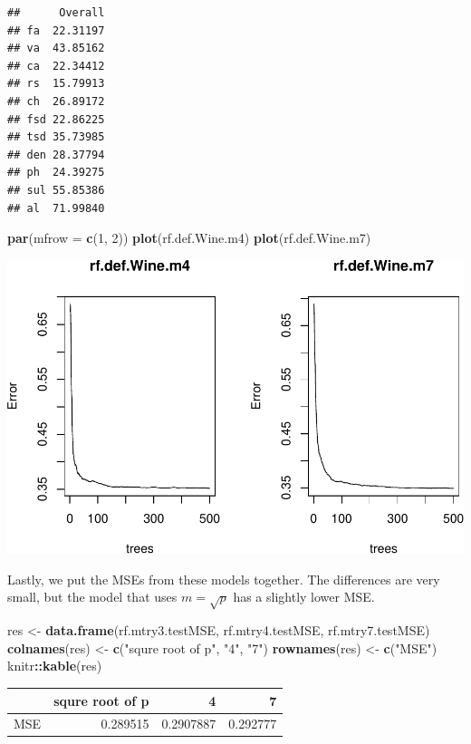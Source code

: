 \documentclass[
]{book}
\newenvironment{Shaded}{\begin{snugshade}}{\end{snugshade}}
\newcommand{\AttributeTok}[1]{\textcolor[rgb]{0.13,0.29,0.53}{#1}}
\newcommand{\DecValTok}[1]{\textcolor[rgb]{0.00,0.00,0.81}{#1}}
\newcommand{\FunctionTok}[1]{\textcolor[rgb]{0.13,0.29,0.53}{\textbf{#1}}}
\newcommand{\NormalTok}[1]{#1}
\newcommand{\OtherTok}[1]{\textcolor[rgb]{0.56,0.35,0.01}{#1}}
\newcommand{\SpecialCharTok}[1]{\textcolor[rgb]{0.81,0.36,0.00}{\textbf{#1}}}
\newcommand{\StringTok}[1]{\textcolor[rgb]{0.31,0.60,0.02}{#1}}
\begin{document}
\begin{verbatim}
##      Overall
## fa  22.31197
## va  43.85162
## ca  22.34412
## rs  15.79913
## ch  26.89172
## fsd 22.86225
## tsd 35.73985
## den 28.37794
## ph  24.39275
## sul 55.85386
## al  71.99840
\end{verbatim}

\begin{Shaded}
\begin{Highlighting}[]
\FunctionTok{par}\NormalTok{(}\AttributeTok{mfrow =} \FunctionTok{c}\NormalTok{(}\DecValTok{1}\NormalTok{, }\DecValTok{2}\NormalTok{))}
\FunctionTok{plot}\NormalTok{(rf.def.Wine.m4)}
\FunctionTok{plot}\NormalTok{(rf.def.Wine.m7)}
\end{Highlighting}
\end{Shaded}

\includegraphics{ml-primer_files/figure-latex/unnamed-chunk-7-1.pdf}

Lastly, we put the MSEs from these models together. The differences are very small, but the model that uses \(m=\sqrt{p}\) has a slightly lower MSE.

\begin{Shaded}
\begin{Highlighting}[]
\NormalTok{res }\OtherTok{\textless{}{-}} \FunctionTok{data.frame}\NormalTok{(rf.mtry3.testMSE, rf.mtry4.testMSE, rf.mtry7.testMSE)}
\FunctionTok{colnames}\NormalTok{(res) }\OtherTok{\textless{}{-}} \FunctionTok{c}\NormalTok{(}\StringTok{"squre root of p"}\NormalTok{, }\StringTok{"4"}\NormalTok{, }\StringTok{"7"}\NormalTok{)}
\FunctionTok{rownames}\NormalTok{(res) }\OtherTok{\textless{}{-}} \FunctionTok{c}\NormalTok{(}\StringTok{"MSE"}\NormalTok{)}
\NormalTok{knitr}\SpecialCharTok{::}\FunctionTok{kable}\NormalTok{(res)}
\end{Highlighting}
\end{Shaded}

\begin{tabular}{l|r|r|r}
\hline
  & squre root of p & 4 & 7\\
\hline
MSE & 0.289515 & 0.2907887 & 0.292777\\
\hline
\end{tabular}

  
\end{document}
